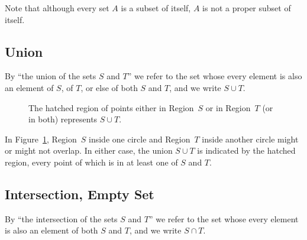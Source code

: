 \noindent Note that although every set $A$ is a subset of itself, $A$ is not a
proper subset of itself.

\subsection{Union}

\begin{definition}
   By ``the union of the sets $S$ and $T$'' we refer to the set whose every
   element is also an element of $S$, of $T$, or else of both $S$ and $T$, and
   we write $S \cup T$.
\end{definition}

\begin{figure}
   \begin{center}
   \end{center}
   \caption{The hatched region of points either in Region~$S$ or in Region~$T$
   (or in both) represents $S \cup T$.}
\label{fig:union}
\end{figure}

\noindent In Figure~\ref{fig:union}, Region~$S$ inside one circle and
Region~$T$ inside another circle might or might not overlap. In either case,
the union $S \cup T$ is indicated by the hatched region, every point of which
is in at least one of $S$ and $T$.

\subsection{Intersection, Empty Set}

\begin{definition}
   By ``the intersection of the sets $S$ and $T$'' we refer to the set whose
   every element is also an element of both $S$ and $T$, and we write $S \cap
   T$.
\end{definition}

